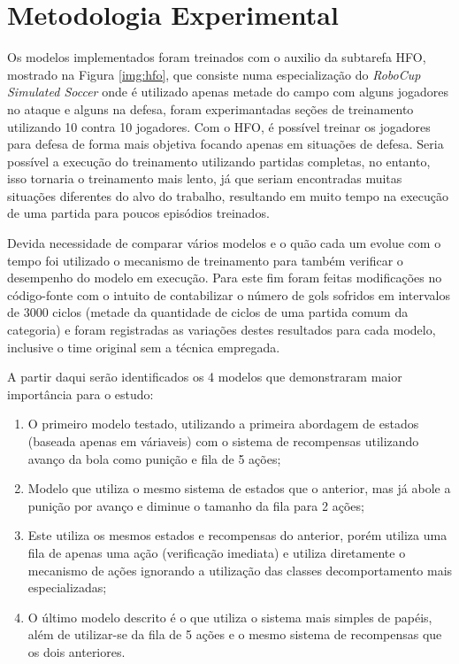 \section{Metodologia Experimental}\label{meotodologia}

Os modelos implementados foram treinados com o auxilio da subtarefa HFO,
mostrado na Figura \ref{img:hfo}, que consiste numa especialização do
\textit{RoboCup Simulated Soccer} onde é utilizado apenas metade do campo com
alguns jogadores no ataque e alguns na defesa, foram experimantadas seções de
treinamento utilizando 10 contra 10 jogadores. Com o HFO, é
possível treinar os jogadores para defesa de forma mais objetiva focando apenas
em situações de defesa. Seria possível a execução do treinamento utilizando
partidas completas, no entanto, isso tornaria o treinamento mais lento, já que
seriam encontradas muitas situações diferentes do alvo do trabalho,
resultando em muito tempo na execução de uma partida para poucos episódios
treinados.


Devida necessidade de comparar vários modelos e o quão cada um evolue com o
tempo foi utilizado o mecanismo de treinamento para também verificar o
desempenho do modelo em execução. Para este fim foram feitas modificações no
código-fonte com o intuito de contabilizar o número de gols sofridos em
intervalos de 3000 ciclos (metade da quantidade de ciclos de uma partida comum
da categoria) e foram registradas as variações destes resultados para cada
modelo, inclusive o time original sem a técnica empregada.

A partir daqui serão identificados os 4 modelos que demonstraram maior
importância para o estudo:

\begin{enumerate}
    \item\label{model:old} O primeiro modelo testado, utilizando a primeira abordagem de estados
    (baseada apenas em váriaveis) com o sistema de recompensas utilizando avanço
    da bola como punição e fila de 5 ações;
    \item\label{model:2cycles} Modelo que utiliza o mesmo sistema de estados que o anterior, mas já
    abole a punição por avanço e diminue o tamanho da fila para 2 ações;
    \item\label{model:1cycle} Este utiliza os mesmos estados e recompensas do anterior, porém
    utiliza uma fila de apenas uma ação (verificação imediata) e utiliza
    diretamente o mecanismo de ações ignorando a utilização das classes
    decomportamento mais especializadas;
    \item\label{model:simple} O último modelo descrito é o que utiliza o sistema mais simples de
    papéis, além de utilizar-se da fila de 5 ações e o mesmo sistema de
    recompensas que os dois anteriores.
\end{enumerate}